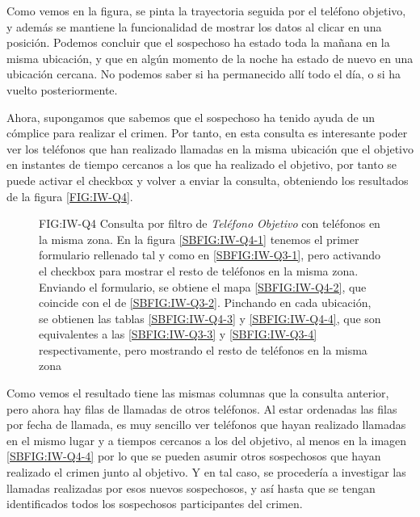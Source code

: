     Como vemos en la figura, se pinta la trayectoria seguida por el teléfono objetivo, y además se mantiene la funcionalidad de mostrar los datos al clicar en una posición. 
    Podemos concluir que el sospechoso ha estado toda la mañana en la misma ubicación, y que en algún momento de la noche ha estado de nuevo en una ubicación cercana. No podemos saber si ha permanecido allí todo el día, o si ha vuelto posteriormente.
    
    Ahora, supongamos que sabemos que el sospechoso ha tenido ayuda de un cómplice para realizar el crimen. Por tanto, en esta consulta es interesante poder ver los teléfonos que han realizado llamadas en la misma ubicación que el objetivo en instantes de tiempo cercanos a los que ha realizado el objetivo, por tanto se puede activar el checkbox y volver a enviar la consulta, obteniendo los resultados de la figura \ref{FIG:IW-Q4}. 
    
    \begin{figure}[Consulta por filtro de \textit{Teléfono Objetivo} con teléfonos en la misma zona]{FIG:IW-Q4}
      {Consulta por filtro de \textit{Teléfono Objetivo} con teléfonos en la misma zona. En la figura \ref{SBFIG:IW-Q4-1} tenemos el primer formulario rellenado tal y como en \ref{SBFIG:IW-Q3-1}, pero activando el checkbox para mostrar el resto de teléfonos en la misma zona. Enviando el formulario, se obtiene el mapa \ref{SBFIG:IW-Q4-2}, que coincide con el de \ref{SBFIG:IW-Q3-2}. Pinchando en cada ubicación, se obtienen las tablas \ref{SBFIG:IW-Q4-3} y \ref{SBFIG:IW-Q4-4}, que son equivalentes a las \ref{SBFIG:IW-Q3-3} y \ref{SBFIG:IW-Q3-4} respectivamente, pero mostrando el resto de teléfonos en la misma zona}
      \quad
      \quad
      \quad
    \end{figure}
    
    Como vemos el resultado tiene las mismas columnas que la consulta anterior, pero ahora hay filas de llamadas de otros teléfonos. 
    Al estar ordenadas las filas por fecha de llamada, es muy sencillo ver teléfonos que hayan realizado llamadas en el mismo lugar y a tiempos cercanos a los del objetivo, al menos en la imagen \ref{SBFIG:IW-Q4-4} por lo que se pueden asumir otros sospechosos que hayan realizado el crimen junto al objetivo. Y en tal caso, se procedería a investigar las llamadas realizadas por esos nuevos sospechosos, y así hasta que se tengan identificados todos los sospechosos participantes del crimen.